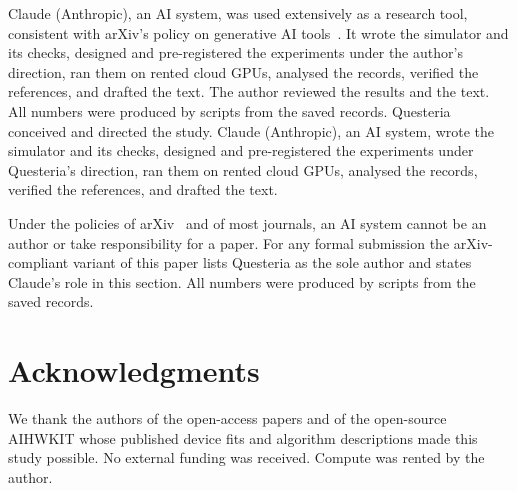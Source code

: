 Claude (Anthropic), an AI system, was used extensively as a research tool, consistent with arXiv's policy on generative AI
tools~\cite{arxiv_policy}. It wrote the simulator and its checks, designed and pre-registered the experiments under the
author's direction, ran them on rented cloud GPUs, analysed the records, verified the references, and drafted the text. The
author reviewed the results and the text. All numbers were produced by scripts from the saved records.
\else
Questeria conceived and directed the study. Claude (Anthropic), an AI system, wrote the simulator and its checks, designed and
pre-registered the experiments under Questeria's direction, ran them on rented cloud GPUs, analysed the records, verified the
references, and drafted the text.

Under the policies of arXiv~\cite{arxiv_policy} and of most journals, an AI system cannot be an author or take responsibility
for a paper. For any formal submission the arXiv-compliant variant of this paper lists Questeria as the sole author and states
Claude's role in this section. All numbers were produced by scripts from the saved records.
\fi

\section*{Acknowledgments}
We thank the authors of the open-access papers and of the open-source AIHWKIT whose published device fits and algorithm
descriptions made this study possible. No external funding was received. Compute was rented by the author.




\appendix






